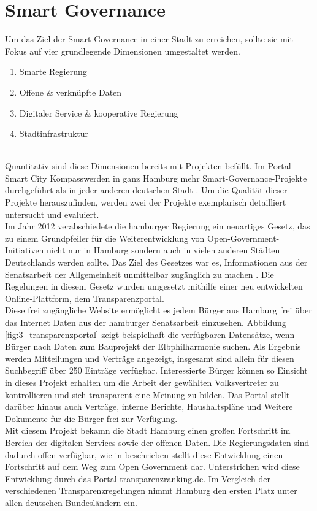 \section{Smart Governance}

Um das Ziel der Smart Governance in einer Stadt zu erreichen, sollte sie mit Fokus auf vier grundlegende Dimensionen umgestaltet werden.
\begin{enumerate}
	\item Smarte Regierung
	\item Offene \& verknüpfte Daten
	\item Digitaler Service \& kooperative Regierung
	\item Stadtinfrastruktur
\end{enumerate}
\autocite[14]{Fuetterer.2020}
\\ Quantitativ sind diese Dimensionen bereits mit Projekten befüllt. Im Portal \glqq Smart City Kompass\grqq\space werden in ganz Hamburg mehr Smart-Governance-Projekte durchgeführt als in jeder anderen deutschen Stadt \autocite{SmartCityKompass.2020}. Um die Qualität dieser Projekte herauszufinden, werden zwei der Projekte exemplarisch detailliert untersucht und evaluiert.
\\ Im Jahr 2012 verabschiedete die hamburger Regierung ein neuartiges Gesetz, das zu einem Grundpfeiler für die Weiterentwicklung von Open-Government-Initiativen nicht nur in Hamburg sondern auch in vielen anderen Städten Deutschlands werden sollte. Das Ziel des Gesetzes war es, Informationen aus der Senatsarbeit der Allgemeinheit unmittelbar zugänglich zu machen \autocite{Senat.2012}. Die Regelungen in diesem Gesetz wurden umgesetzt mithilfe einer neu entwickelten Online-Plattform, dem \glqq Transparenzportal\grqq.
\\ Diese frei zugängliche Website ermöglicht es jedem Bürger aus Hamburg frei über das Internet Daten aus der hamburger Senatsarbeit einzusehen. Abbildung \ref{fig:3_transparenzportal} zeigt beispielhaft die verfügbaren Datensätze, wenn Bürger nach Daten zum Bauprojekt der Elbphilharmonie suchen. Als Ergebnis werden Mitteilungen und Verträge angezeigt, insgesamt sind allein für diesen Suchbegriff über 250 Einträge verfügbar. Interessierte Bürger können so Einsicht in dieses Projekt erhalten um die Arbeit der gewählten Volksvertreter zu kontrollieren und sich transparent eine Meinung zu bilden. Das Portal stellt darüber hinaus auch Verträge, interne Berichte, Haushaltspläne und Weitere Dokumente für die Bürger frei zur Verfügung.
\\ Mit diesem Projekt bekamn die Stadt Hamburg einen großen Fortschritt im Bereich der digitalen Services sowie der offenen Daten. Die Regierungsdaten sind dadurch offen verfügbar, wie in \citeauthor[15]{Fuetterer.2020} beschrieben stellt diese Entwicklung einen Fortschritt auf dem Weg zum Open Government dar. Unterstrichen wird diese Entwicklung durch das Portal transparenzranking.de. Im Vergleich der verschiedenen Transparenzregelungen nimmt Hamburg den ersten Platz unter allen deutschen Bundesländern ein.

